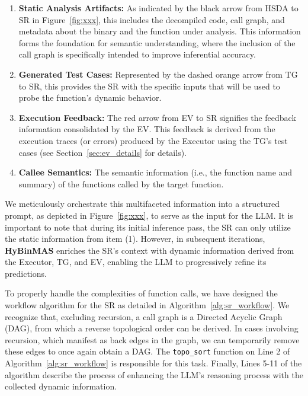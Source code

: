 \documentclass[acmsmall,screen,review,anonymous]{acmart} %
\begin{document}
\begin{enumerate}
    \item \textbf{Static Analysis Artifacts:} As indicated by the black arrow from HSDA to SR in Figure~\ref{fig:xxx}, this includes the decompiled code, call graph, and metadata about the binary and the function under analysis. This information forms the foundation for semantic understanding, where the inclusion of the call graph is specifically intended to improve inferential accuracy.
    \item \textbf{Generated Test Cases:} Represented by the dashed orange arrow from TG to SR, this provides the SR with the specific inputs that will be used to probe the function's dynamic behavior.
    \item \textbf{Execution Feedback:} The red arrow from EV to SR signifies the feedback information consolidated by the EV. This feedback is derived from the execution traces (or errors) produced by the Executor using the TG's test cases (see Section~\ref{sec:ev_details} for details).
    \item \textbf{Callee Semantics:} The semantic information (i.e., the function name and summary) of the functions called by the target function.
\end{enumerate}

We meticulously orchestrate this multifaceted information into a structured prompt, as depicted in Figure~\ref{fig:xxx}, to serve as the input for the LLM. It is important to note that during its initial inference pass, the SR can only utilize the static information from item (1). However, in subsequent iterations, \textbf{HyBinMAS} enriches the SR's context with dynamic information derived from the Executor, TG, and EV, enabling the LLM to progressively refine its predictions.

To properly handle the complexities of function calls, we have designed the workflow algorithm for the SR as detailed in Algorithm~\ref{alg:sr_workflow}. We recognize that, excluding recursion, a call graph is a Directed Acyclic Graph (DAG), from which a reverse topological order can be derived. In cases involving recursion, which manifest as back edges in the graph, we can temporarily remove these edges to once again obtain a DAG. The \texttt{topo\_sort} function on Line 2 of Algorithm~\ref{alg:sr_workflow} is responsible for this task. Finally, Lines 5-11 of the algorithm describe the process of enhancing the LLM's reasoning process with the collected dynamic information.
\end{document}
